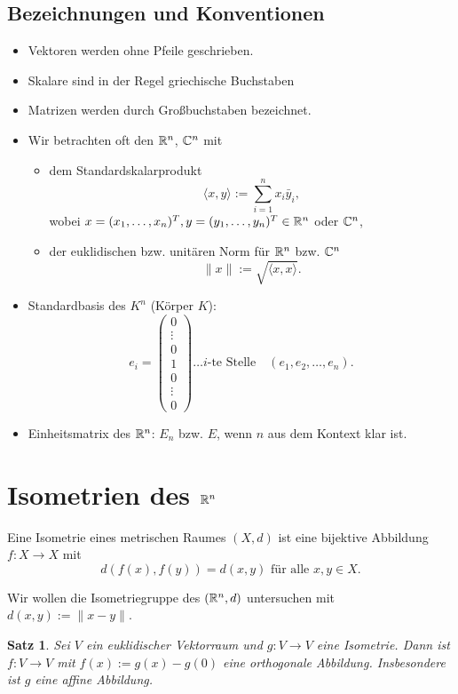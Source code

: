 \documentclass[
 a4paper,
 12pt,
 parskip=half
 ]{scrartcl}
\theoremstyle{plain}
\newtheorem{thm}{Satz}[section] %
\theoremstyle{definition}
\begin{document}
\subsection{Bezeichnungen und Konventionen}
\begin{itemize}
 \item Vektoren werden ohne Pfeile geschrieben.
 \item Skalare sind in der Regel griechische Buchstaben
 \item Matrizen werden durch Großbuchstaben bezeichnet.
 \item Wir betrachten oft den $\mathbb{R}^n$, $\mathbb{C}^n$ mit 
  \begin{itemize}
   \item dem Standardskalarprodukt
    \[ \langle x, y \rangle := \sum_{i=1}^n x_i \bar{y}_i, \]
    wobei $x = (x_1, \ldots, x_n)^T, y = (y_1, \ldots, y_n)^T \in \mathbb{R}^n$ oder $\mathbb{C}^n$, 
   \item der euklidischen bzw. unitären Norm für $\mathbb{R}^n$ bzw. $\mathbb{C}^n$
    \[ \| x \| := \sqrt{ \langle x,x \rangle }. \]
  \end{itemize}
 \item Standardbasis des $K^n$ (Körper $K$):
  \[ e_i = \begin{pmatrix} 0 \\ \vdots \\ 0 \\ 1 \\ 0 \\ \vdots \\ 0 \end{pmatrix} \ldots i\text{-te Stelle} \quad (e_1, e_2, \ldots, e_n). \]
 \item Einheitsmatrix des $\mathbb{R}^n$: $E_n$ bzw. $E$, wenn $n$ aus dem Kontext klar ist.
\end{itemize}

\setcounter{secnumdepth}{1}
\section{Isometrien des \texorpdfstring{$\mathbb{R}^n$}{Rn}}
Eine Isometrie eines metrischen Raumes $(X, d)$ ist eine bijektive Abbildung $f: X \to X$ mit
\[ d( f(x), f(y) ) = d(x,y) \text{ für alle } x, y \in X. \]

Wir wollen die Isometriegruppe des $(\mathbb{R}^n, d)$ untersuchen mit $d(x,y) := \| x - y \|$.

\begin{thm}
 Sei $V$ ein euklidischer Vektorraum und $g: V \to V$ eine Isometrie. Dann ist $f: V \to V$ mit $f(x) := g(x) - g(0)$ eine orthogonale Abbildung. Insbesondere ist $g$ eine affine Abbildung.
\end{thm}
\end{document}
